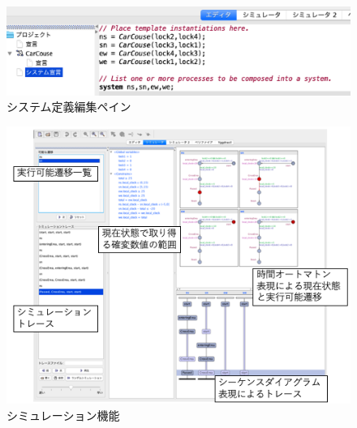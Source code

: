 \documentclass{tpu-sotu}
\begin{document}
	\begin{figure}[htbp]
	\centering
	\includegraphics[width=140mm]{SystemDec.png}
	\caption{システム定義編集ペイン}
	\label{SysD}
	\end{figure}
	\begin{figure}[htbp]
	\centering
	\includegraphics[width=160mm]{ExmpleSimulationResult.png}
	\caption{シミュレーション機能}
	\label{ESR}
	\end{figure}
\end{document}
